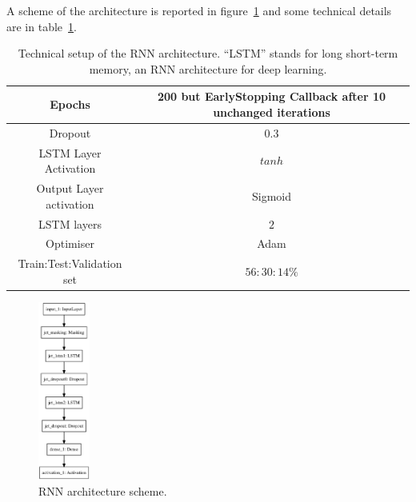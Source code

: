 
A scheme of the architecture is reported in figure~\ref{fig:RNNArchitecture} and some technical details are in table~\ref{tab:RNNArchitecture}.
\begin{table}[ht]
\centering
\begin{tabular}{c|c}
\toprule
\midrule
Epochs     & 200 but EarlyStopping Callback after 10 unchanged iterations     \\
\midrule
Dropout     & $0.3 $   \\
\midrule
LSTM Layer Activation     & $tanh $   \\
\midrule
Output Layer activation     & Sigmoid   \\
\midrule
LSTM layers     & $2$   \\
\midrule
Optimiser     & Adam   \\
\midrule
Train:Test:Validation set     & $56:30:14 \%$   \\
\midrule
\bottomrule
\end{tabular}
\caption{Technical setup of the RNN architecture. ``LSTM'' stands for long short-term memory, an RNN architecture for deep learning.}
\label{tab:RNNArchitecture}
\end{table}

\begin{figure}[ht]
       \centering
       \includegraphics[width=0.15\textwidth]{figures/RNN/model.eps}
       \caption{RNN architecture scheme.}
       \label{fig:RNNArchitecture}
\end{figure}

